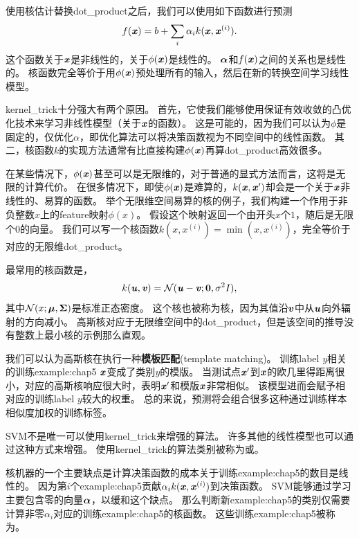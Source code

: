 使用核估计替换\gls{dot_product}之后，我们可以使用如下函数进行预测
\begin{equation}
    f(\boldsymbol{\mathit{x}}) = b + \sum_i \alpha_i k(\boldsymbol{\mathit{x}}, \boldsymbol{\mathit{x}}^{(i)}) .
\end{equation}
这个函数关于$\boldsymbol{\mathit{x}}$是非线性的，关于$\phi(\boldsymbol{\mathit{x}})$是线性的。
$\boldsymbol{\alpha}$和$f(\boldsymbol{\mathit{x}})$之间的关系也是线性的。
核函数完全等价于用$\phi(\boldsymbol{\mathit{x}})$预处理所有的输入，然后在新的转换空间学习线性模型。

\gls{kernel_trick}十分强大有两个原因。
首先，它使我们能够使用保证有效收敛的凸优化技术来学习非线性模型（关于$\boldsymbol{\mathit{x}}$的函数）。
这是可能的，因为我们可以认为$\phi$是固定的，仅优化$\alpha$，即优化算法可以将决策函数视为不同空间中的线性函数。
其二，核函数$k$的实现方法通常有比直接构建$\phi(\boldsymbol{\mathit{x}})$再算\gls{dot_product}高效很多。

在某些情况下，$\phi(\boldsymbol{\mathit{x}})$甚至可以是无限维的，对于普通的显式方法而言，这将是无限的计算代价。
在很多情况下，即使$\phi(\boldsymbol{\mathit{x}})$是难算的，$k(\boldsymbol{\mathit{x}},\boldsymbol{\mathit{x}}')$却会是一个关于$\boldsymbol{\mathit{x}}$非线性的、易算的函数。
举个无限维空间易算的核的例子，我们构建一个作用于非负整数$x$上的\gls{feature}映射$\phi(x)$。
假设这个映射返回一个由开头$x$个$1$，随后是无限个$0$的向量。
我们可以写一个核函数$k(x,x^{(i)}) = \min(x, x^{(i)})$，完全等价于对应的无限维\gls{dot_product}。


最常用的核函数是，
\begin{equation}
    k(\boldsymbol{\mathit{u}}, \boldsymbol{\mathit{v}}) = \mathcal{N} (\boldsymbol{\mathit{u}} - \boldsymbol{\mathit{v}}; \mathbf{0}, \sigma^2 I) ,
\end{equation}
其中$\mathcal{N}(x; \boldsymbol{\mu}, \boldsymbol{\Sigma})$是标准正态密度。
这个核也被称为核，因为其值沿$\boldsymbol{\mathit{v}}$中从$\boldsymbol{\mathit{u}}$向外辐射的方向减小。
高斯核对应于无限维空间中的\gls{dot_product}，但是该空间的推导没有整数上最小核的示例那么直观。

我们可以认为高斯核在执行一种\textbf{模板匹配}(template matching)。
训练\gls{label} $y$相关的训练\gls{example:chap5} $\boldsymbol{\mathit{x}}$变成了类别$y$的模版。
当测试点$\boldsymbol{\mathit{x}}'$到$\boldsymbol{\mathit{x}}$的欧几里得距离很小，对应的高斯核响应很大时，表明$\boldsymbol{\mathit{x}}'$和模版$\boldsymbol{\mathit{x}}$非常相似。
该模型进而会赋予相对应的训练\gls{label} $y$较大的权重。
总的来说，预测将会组合很多这种通过训练样本相似度加权的训练标签。

\gls{SVM}不是唯一可以使用\gls{kernel_trick}来增强的算法。
许多其他的线性模型也可以通过这种方式来增强。
使用\gls{kernel_trick}的算法类别被称为或\citep{Williams+Rasmussen-nips8,Scholkopf99}。    

核机器的一个主要缺点是计算决策函数的成本关于训练\gls{example:chap5}的数目是线性的。
因为第$i$个\gls{example:chap5}贡献$\alpha_i k(\boldsymbol{\mathit{x}}, \boldsymbol{\mathit{x}}^{(i)})$到决策函数。
\gls{SVM}能够通过学习主要包含零的向量$\boldsymbol{\alpha}$，以缓和这个缺点。
那么判断新\gls{example:chap5}的类别仅需要计算非零$\alpha_i$对应的训练\gls{example:chap5}的核函数。
这些训练\gls{example:chap5}被称为。

